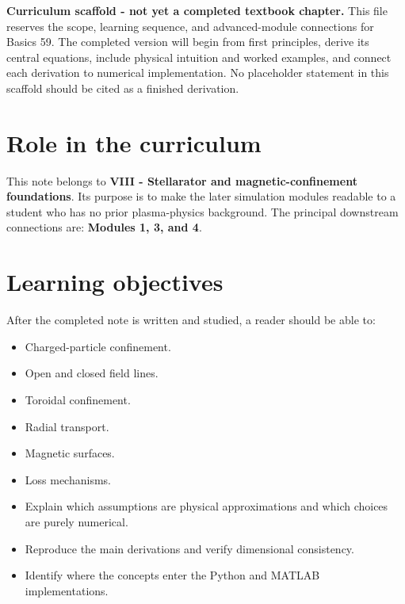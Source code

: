 \documentclass[11pt]{article}
\begin{document}

\begin{overviewbox}
\textbf{Curriculum scaffold - not yet a completed textbook chapter.} This file reserves the scope, learning sequence, and advanced-module connections for Basics 59. The completed version will begin from first principles, derive its central equations, include physical intuition and worked examples, and connect each derivation to numerical implementation. No placeholder statement in this scaffold should be cited as a finished derivation.
\end{overviewbox}

\ProjectTOC

\section{Role in the curriculum}
This note belongs to \textbf{VIII - Stellarator and magnetic-confinement foundations}. Its purpose is to make the later simulation modules readable to a student who has no prior plasma-physics background. The principal downstream connections are: \textbf{Modules 1, 3, and 4}.

\section{Learning objectives}
After the completed note is written and studied, a reader should be able to:
\begin{itemize}[leftmargin=1.6em]
\item Charged-particle confinement.
\item Open and closed field lines.
\item Toroidal confinement.
\item Radial transport.
\item Magnetic surfaces.
\item Loss mechanisms.
\item Explain which assumptions are physical approximations and which choices are purely numerical.
\item Reproduce the main derivations and verify dimensional consistency.
\item Identify where the concepts enter the Python and MATLAB implementations.
\end{itemize}
\end{document}

